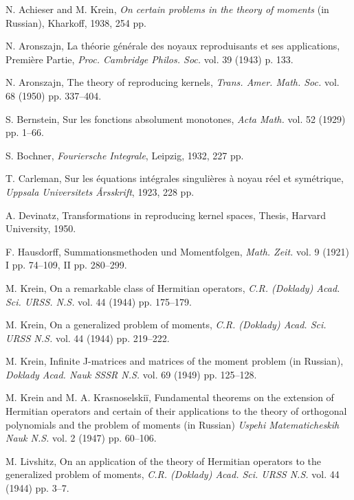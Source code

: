 \documentclass{article}
\begin{document}
\begin{thebibliography}{99}

 N. Achieser and M. Krein, \emph{On certain problems in the theory of moments} (in Russian), Kharkoff, 1938, 254 pp.

 N. Aronszajn, La théorie générale des noyaux reproduisants et ses applications, Première Partie, \emph{Proc. Cambridge Philos. Soc.} vol. 39 (1943) p. 133.

 N. Aronszajn, The theory of reproducing kernels, \emph{Trans. Amer. Math. Soc.} vol. 68 (1950) pp. 337--404.

 S. Bernstein, Sur les fonctions absolument monotones, \emph{Acta Math.} vol. 52 (1929) pp. 1--66.

 S. Bochner, \emph{Fouriersche Integrale}, Leipzig, 1932, 227 pp.

 T. Carleman, Sur les équations intégrales singulières à noyau réel et symétrique, \emph{Uppsala Universitets Årsskrift}, 1923, 228 pp.

 A. Devinatz, Transformations in reproducing kernel spaces, Thesis, Harvard University, 1950.

 F. Hausdorff, Summationsmethoden und Momentfolgen, \emph{Math. Zeit.} vol. 9 (1921) I pp. 74--109, II pp. 280--299.

 M. Krein, On a remarkable class of Hermitian operators, \emph{C.R. (Doklady) Acad. Sci. URSS. N.S.} vol. 44 (1944) pp. 175--179.

 M. Krein, On a generalized problem of moments, \emph{C.R. (Doklady) Acad. Sci. URSS N.S.} vol. 44 (1944) pp. 219--222.

 M. Krein, Infinite J-matrices and matrices of the moment problem (in Russian), \emph{Doklady Acad. Nauk SSSR N.S.} vol. 69 (1949) pp. 125--128.

 M. Krein and M. A. Krasnoselskiï, Fundamental theorems on the extension of Hermitian operators and certain of their applications to the theory of orthogonal polynomials and the problem of moments (in Russian) \emph{Uspehi Matematicheskih Nauk N.S.} vol. 2 (1947) pp. 60--106.

 M. Livshitz, On an application of the theory of Hermitian operators to the generalized problem of moments, \emph{C.R. (Doklady) Acad. Sci. URSS N.S.} vol. 44 (1944) pp. 3--7.


\end{thebibliography}
\end{document}
